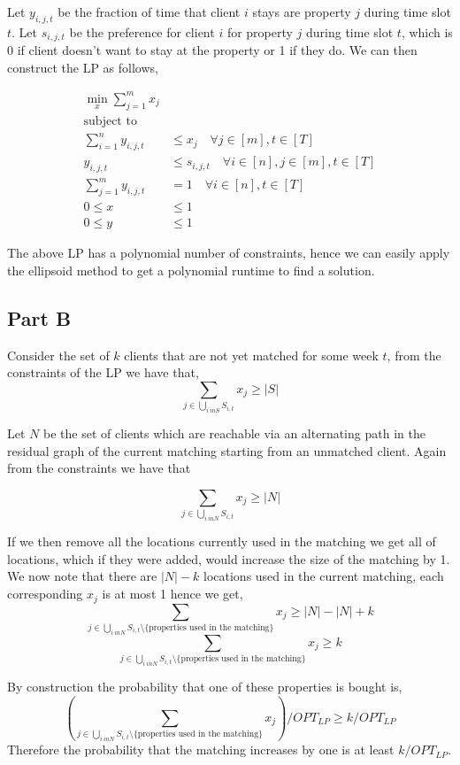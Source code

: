 \documentclass[a4paper]{article}
\begin{document}
Let $y_{i,j,t}$ be the fraction of time that client $i$ stays are property $j$ during 
time slot $t$. 
Let $s_{i,j,t}$ be the preference for client $i$ for property $j$ during 
time slot $t$, which is 0 if client doesn't want to stay at the property or 1 if they do. 
We can then construct the LP as follows, 

\begin{align}
	\min_{x} \sum_{j=1}^m x_j\\
	\text{subject to}\\
	\sum_{i=1}^n y_{i,j,t} &\leq x_j \quad \forall j\in [m], t \in [T]\\
	y_{i,j,t} &\leq s_{i,j,t} \quad \forall i\in [n], j\in [m], t \in [T]\\
	\sum_{j=1}^m y_{i,j,t} &= 1 \quad \forall i\in [n], t \in [T]\\
		0 \leq x &\leq 1\\
		0 \leq y &\leq 1
\end{align}

The above LP has a polynomial number of constraints, hence we can easily apply the 
ellipsoid method to get a polynomial runtime to find a solution.

\subsection{Part B}

Consider the set of $k$ clients that are not yet matched for some week $t$, from the constraints of 
the LP we have that,
$$\sum_{j\in \bigcup_{i \ in S} S_{i,t}} x_j \geq |S|$$

Let $N$ be the set of clients which are reachable via an alternating path
in the residual graph of the current matching starting from an unmatched client.
Again from the constraints we have that

$$\sum_{j\in \bigcup_{i \ in N} S_{i,t}} x_j \geq |N|$$

If we then remove all the locations currently used in the matching we get all 
of locations, which if they were added, would increase the size of the matching 
by 1. We now note that there are $|N| - k$ locations used in the current matching, each 
corresponding $x_j$ is at most 1 hence we get, 
$$\sum_{j\in \bigcup_{i \ in N} S_{i,t} \setminus \{\text{properties used in the matching}\}} x_j \geq |N| - |N| + k$$
$$\sum_{j\in \bigcup_{i \ in N} S_{i,t} \setminus \{\text{properties used in the matching}\}} x_j \geq k$$

By construction the probability that one of these properties is bought is,
$$ (\sum_{j\in \bigcup_{i \ in N} S_{i,t}  \setminus \{\text{properties used in the matching}\}} x_j) / OPT_{LP} \geq  k / OPT_{LP}$$
Therefore the probability that the matching increases by one is at least $k / OPT_{LP}$.
\end{document}
